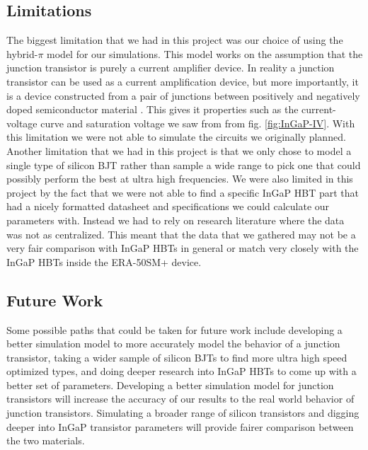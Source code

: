 \documentclass[conference]{IEEEtran}
\begin{document}
\subsection{Limitations}

The biggest limitation that we had in this project was our choice of using the hybrid-$\pi$ model for our simulations. This model works on the assumption
that the junction transistor is purely a current amplifier device. In reality a junction transistor can be used as a current amplification device, but more
importantly, it is a device constructed from a pair of junctions between positively and negatively doped semiconductor material \cite{sze_physics_2007}.
This gives it properties such as the current-voltage curve and saturation voltage we saw from from fig. \ref{fig:InGaP-IV}. With this limitation we were
not able to simulate the circuits we originally planned. Another limitation that we had in this project is that we only chose to model a single type of
silicon BJT rather than sample a wide range to pick one that could possibly perform the best at ultra high frequencies. We were also limited in this project
by the fact that we were not able to find a specific InGaP HBT part that had a nicely formatted datasheet and specifications we could calculate our parameters
with. Instead we had to rely on research literature where the data was not as centralized. This meant that the data that we gathered may not be a very fair
comparison with InGaP HBTs in general or match very closely with the InGaP HBTs inside the ERA-50SM+ device.

\subsection{Future Work}

Some possible paths that could be taken for future work include developing a better simulation model to more accurately model the behavior of a junction
transistor, taking a wider sample of silicon BJTs to find more ultra high speed optimized types, and doing deeper research into InGaP HBTs to come up with
a better set of parameters. Developing a better simulation model for junction transistors will increase the accuracy of our results to the real world
behavior of junction transistors. Simulating a broader range of silicon transistors and digging deeper into InGaP transistor parameters will provide fairer
comparison between the two materials.

\appendices

\setcounter{table}{0}
\renewcommand{\thetable}{A\arabic{table}}
\end{document}
